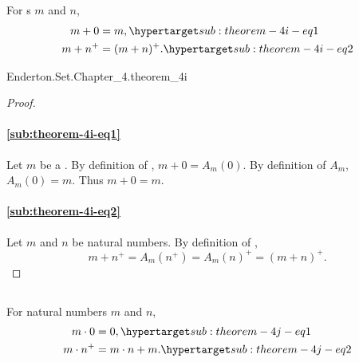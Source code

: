 \documentclass{report}
\begin{document}
\subsection{}

  \begin{theorem}[4I]
    For s $m$ and $n$,
      \begin{align}
        m + 0 & = m, \hyperlabel{sub:theorem-4i-eq1} \\
        m + n^+ & = (m + n)^+. \hyperlabel{sub:theorem-4i-eq2}
      \end{align}
  \end{theorem}

    {Enderton.Set.Chapter\_4.theorem\_4i}



  \begin{proof}

    \paragraph{\eqref{sub:theorem-4i-eq1}}%

      Let $m$ be a .
      By definition of , $m + 0 = A_m(0)$.
      By definition of $A_m$, $A_m(0) = m$.
      Thus $m + 0 = m$.

    \paragraph{\eqref{sub:theorem-4i-eq2}}%

      Let $m$ and $n$ be natural numbers.
      By definition of ,
        $$m + n^+ = A_m(n^+) = A_m(n)^+ = (m + n)^+.$$

  \end{proof}

\subsection{}

  \begin{theorem}[4J]
    For natural numbers $m$ and $n$,
      \begin{align}
        m \cdot 0 & = 0, \hyperlabel{sub:theorem-4j-eq1} \\
        m \cdot n^+ & = m \cdot n + m. \hyperlabel{sub:theorem-4j-eq2}
      \end{align}
  \end{theorem}
\end{document}
